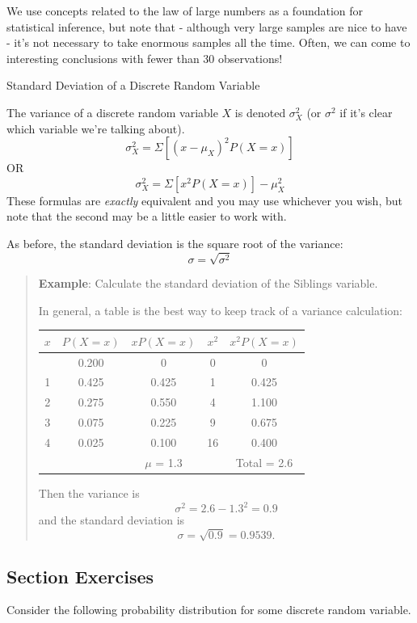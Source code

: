 \documentclass[
]{book}
\begin{document}
We use concepts related to the law of large numbers as a foundation for statistical inference, but note that - although very large samples are nice to have - it's not necessary to take enormous samples all the time. Often, we can come to interesting conclusions with fewer than 30 observations!

Standard Deviation of a Discrete Random Variable

The variance of a discrete random variable \(X\) is denoted \(\sigma_X^2\) (or \(\sigma^2\) if it's clear which variable we're talking about).
\[ \sigma_X^2 = \Sigma[(x-\mu_X)^2P(X=x)]\]
OR
\[ \sigma_X^2 = \Sigma[x^2P(X=x)]-\mu_X^2\]
These formulas are \emph{exactly} equivalent and you may use whichever you wish, but note that the second may be a little easier to work with.

As before, the standard deviation is the square root of the variance: \[\sigma = \sqrt{\sigma^2}\]

\begin{quote}
\textbf{Example}: Calculate the standard deviation of the Siblings variable.

In general, a table is the best way to keep track of a variance calculation:

\begin{longtable}[]{@{}ccccc@{}}
\toprule\noalign{}
\(x\) & \(P(X=x)\) & \(xP(X=x)\) & \(x^2\) & \(x^2P(X=x)\) \\
\midrule\noalign{}
\endhead
\bottomrule\noalign{}
\endlastfoot
0 & 0.200 & 0 & 0 & 0 \\
1 & 0.425 & 0.425 & 1 & 0.425 \\
2 & 0.275 & 0.550 & 4 & 1.100 \\
3 & 0.075 & 0.225 & 9 & 0.675 \\
4 & 0.025 & 0.100 & 16 & 0.400 \\
& & \(\mu\) = 1.3 & & Total = 2.6 \\
\end{longtable}

Then the variance is \[\sigma^2 = 2.6 - 1.3^2 = 0.9\] and the standard deviation is \[\sigma = \sqrt{0.9} = 0.9539.\]
\end{quote}

\subsection*{Section Exercises}\label{section-exercises-13}

Consider the following probability distribution for some discrete random variable.
\end{document}
